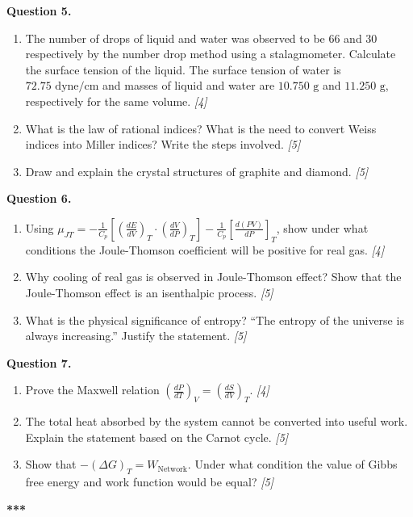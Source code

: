 \documentclass[11pt,a4paper]{article}
\newcommand{\pts}[1]{\hfill \textit{[#1]}}
\begin{document}
\bigskip

\noindent \textbf{Question 5.}
\begin{enumerate}[label=(\alph*)]
  \item The number of drops of liquid and water was observed to be 66 and 30 respectively by the number drop method using a stalagmometer. Calculate the surface tension of the liquid. The surface tension of water is $72.75\text{ dyne/cm}$ and masses of liquid and water are $10.750\text{ g}$ and $11.250\text{ g}$, respectively for the same volume. \pts{4}
  \item What is the law of rational indices? What is the need to convert Weiss indices into Miller indices? Write the steps involved. \pts{5}
  \item Draw and explain the crystal structures of graphite and diamond. \pts{5}
\end{enumerate}

\bigskip

\noindent \textbf{Question 6.}
\begin{enumerate}[label=(\alph*)]
  \item Using $\mu_{JT} = -\frac{1}{C_p} \left[ \left(\frac{dE}{dV}\right)_T \cdot \left(\frac{dV}{dP}\right)_T \right] - \frac{1}{C_p} \left[ \frac{d(PV)}{dP} \right]_T$, show under what conditions the Joule-Thomson coefficient will be positive for real gas. \pts{4}
  \item Why cooling of real gas is observed in Joule-Thomson effect? Show that the Joule-Thomson effect is an isenthalpic process. \pts{5}
  \item What is the physical significance of entropy? ``The entropy of the universe is always increasing.'' Justify the statement. \pts{5}
\end{enumerate}

\bigskip

\noindent \textbf{Question 7.}
\begin{enumerate}[label=(\alph*)]
  \item Prove the Maxwell relation $\left(\frac{dP}{dT}\right)_V = \left(\frac{dS}{dV}\right)_T$. \pts{4}
  \item The total heat absorbed by the system cannot be converted into useful work. Explain the statement based on the Carnot cycle. \pts{5}
  \item Show that $-(\Delta G)_T = W_{\text{Network}}$. Under what condition the value of Gibbs free energy and work function would be equal? \pts{5}
\end{enumerate}

\bigskip
\begin{center}
  \textbf{***}
\end{center}
\end{document}
